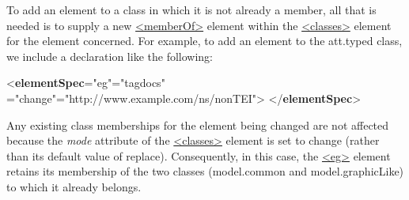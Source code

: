 To add an element to a class in which it is not already a member, all that is needed is to supply a new \hyperref[TEI.memberOf]{<memberOf>} element within the \hyperref[TEI.classes]{<classes>} element for the element concerned. For example, to add an element to the \textsf{att.typed} class, we include a declaration like the following: \par\bgroup{}\exampleFont \begin{shaded}\noindent\mbox{}{<\textbf{elementSpec}\hspace*{1em}{ident}="{eg}"\hspace*{1em}{module}="{tagdocs}"\mbox{}\newline 
\hspace*{1em}{mode}="{change}"\hspace*{1em}{ns}="{http://www.example.com/ns/nonTEI}">}\mbox{}\newline 
{}\mbox{}\newline 
\hspace*{1em}\mbox{}\newline 
{}\mbox{}\newline 
{</\textbf{elementSpec}>}\end{shaded}\egroup\par \noindent  Any existing class memberships for the element being changed are not affected because the {\itshape mode} attribute of the \hyperref[TEI.classes]{<classes>} element is set to change (rather than its default value of replace). Consequently, in this case, the \hyperref[TEI.eg]{<eg>} element retains its membership of the two classes (\textsf{model.common} and \textsf{model.graphicLike}) to which it already belongs.\par
